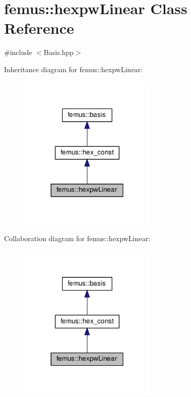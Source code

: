 \hypertarget{classfemus_1_1hexpw_linear}{}\section{femus\+:\+:hexpw\+Linear Class Reference}
\label{classfemus_1_1hexpw_linear}


{\ttfamily \#include $<$Basis.\+hpp$>$}



Inheritance diagram for femus\+:\+:hexpw\+Linear\+:
\nopagebreak
\begin{figure}[H]
\begin{center}
\leavevmode
\includegraphics[width=187pt]{classfemus_1_1hexpw_linear__inherit__graph}
\end{center}
\end{figure}


Collaboration diagram for femus\+:\+:hexpw\+Linear\+:
\nopagebreak
\begin{figure}[H]
\begin{center}
\leavevmode
\includegraphics[width=187pt]{classfemus_1_1hexpw_linear__coll__graph}
\end{center}
\end{figure}
